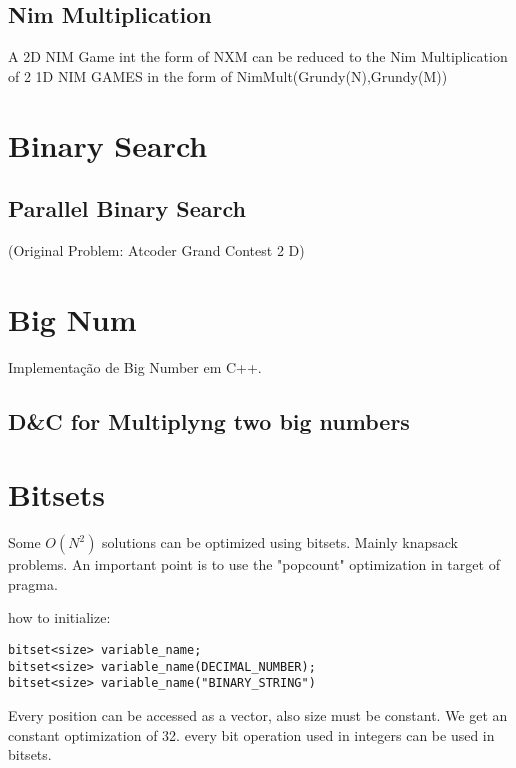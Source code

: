     \subsection{Nim Multiplication}
        A 2D NIM Game int the form of NXM can be reduced
        to the Nim Multiplication of 2 1D NIM GAMES
        in the form of NimMult(Grundy(N),Grundy(M))
        
        
\section{Binary Search}
    \subsection{Parallel Binary Search}
    (Original Problem: Atcoder Grand Contest 2 D)
     
%     
\section{Big Num}
    Implementação de Big Number em C++.
        
    \subsection{D\&C for Multiplyng two big numbers}
        

\section{Bitsets}
Some $O(N^2)$ solutions can be optimized using bitsets. Mainly knapsack problems.
An important point is to use the "popcount" optimization  in target of pragma.

how to initialize:

\begin{lstlisting}
bitset<size> variable_name;
bitset<size> variable_name(DECIMAL_NUMBER);
bitset<size> variable_name("BINARY_STRING")
\end{lstlisting}

Every position can be accessed as a vector, also size must be constant. We get an constant optimization of 32. every bit operation used in integers can be used in bitsets.

